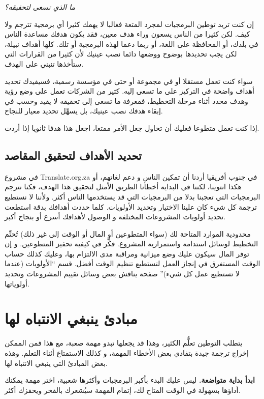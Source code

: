 {\it
ما الذي تسعى لتحقيقه؟}

إن كنت تريد توطين البرمجيات لمجرد المتعة فغالبا لا يهمك كثيرا أي برمجية
تترجم ولا كيف. لكن كثيرا من الناس يسعون وراء هدف معين، فقد يكون هدفك
مساعدة الناس في بلدك، أو المحافظة على اللغة، أو ربما دعما لهذه البرمجية
أو تلك. كلها أهداف نبيلة، لكن يجب تحديدها بوضوح ووضعها دائما نصب عينيك
لأن كثيرا من القرارات التي ستأخذها تنبني على الهدف.

سواء كنت تعمل مستقلا أو في مجموعة أو حتى في مؤسسة رسمية، فسيفيدك تحديد
أهداف واضحة في التركيز على ما تسعى إليه. كثير من الشركات تعمل على وضع
رؤية وهدف محدد أثناء مرحلة التخطيط، فمعرفة ما تسعى إلى تحقيقه لا يفيد
وحسب في إبقاء هدفك نصب عينيك، بل يسهِّل تحديد معيار للنجاح.

إذا كنت تعمل متطوعا فعليك أن تحاول جعل الأمر ممتعا، اجعل هذا هدفا ثانويا
إذا أردت.

\subsection{تحديد الأهداف لتحقيق المقاصد}
في مشروع Translate.org.za في جنوب أفريقيا أردنا أن تمكين الناس و دعم
لغاتهم، أو هكذا انتوينا، لكننا في البداية أخطأنا الطريق الأمثل لتحقيق
هذا الهدف، فكنا نترجم البرمجيات التي تعجبنا بدلا من البرمجيات التي قد
يستخدمها الناس أكثر. ولأننا لا نستطيع ترجمة كل شيء كان علينا الاختيار
وتحديد الأولويات. كلما حددت أهدافك بدقة استطعت تحديد أولويات المشروعات
المختلفة و الوصول لأهدافك أسرع أو بنجاح أكبر.

محدودية الموارد المتاحة لك (سواء المتطوعين أو المال أو الوقت إلى غير
ذلك) تُحتِّم التخطيط لوسائل استدامة واستمرارية المشروع. فكِّر في كيفية
تحفيز المتطوعين. و إن توفر المال سيكون عليك وضع ميزانية ومراقبة مدى
الالتزام بها، وعليك كذلك حساب الوقت المستغرق في إنجاز العمل لتستطيع
تنظيم الوقت أفضل. قسم “الأولويات (عندما لا تستطيع عمل كل شيء)” صفحة
\at[ref:36383525] يناقش بعض وسائل تقييم المشروعات وتحديد
أولوياتها.

\section{مبادئ ينبغي الانتباه لها}
يتطلب التوطين تعلُّم الكثير، وهذا قد يجعلها تبدو مهمة صعبة، مع هذا فمن
الممكن إخراج ترجمة جيدة بتفادي بعض الأخطاء المهمة، و كذلك الاستمتاع
أثناء التعلم. وهذه بعض المبادئ التي ينبغي الانتباه لها.

{\bf ابدأ بداية متواضعة.} ليس عليك البدء بأكبر البرمجيات وأكثرها شعبية،
اختر مهمة يمكنك أداؤها بسهولة في الوقت المتاح لك، إتمام المهمة سيُشعرك
بالفخر ويحفزك أكثر.

